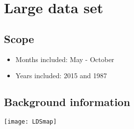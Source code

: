 \section{Large data set}
\subsection{Scope}
\begin{itemize}
	\item Months included: May - October
	\item Years included: 2015 and 1987
\end{itemize}
\subsection{Background information}
\texttt{[image: LDSmap]}\\
